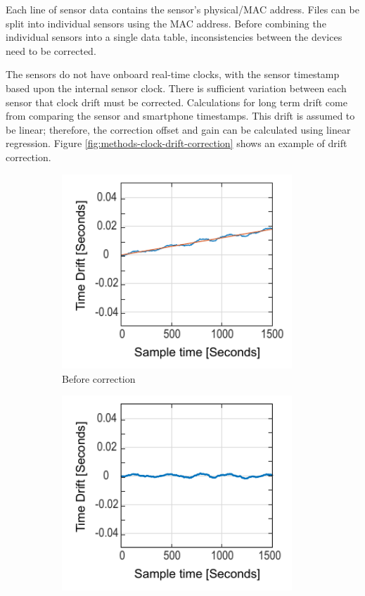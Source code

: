 Each line of sensor data contains the sensor's physical/MAC address. Files can be split into individual sensors using the MAC address. Before combining the individual sensors into a single data table, inconsistencies between the devices need to be corrected.

The sensors do not have onboard real-time clocks, with the sensor timestamp based upon the internal sensor clock. There is sufficient variation between each sensor that clock drift must be corrected. Calculations for long term drift come from comparing the sensor and smartphone timestamps. This drift is assumed to be linear; therefore, the correction offset and gain can be calculated using linear regression. Figure \ref{fig:methods-clock-drift-correction} shows an example of drift correction.

\begin{figure}[hbt]
    \centering
    \begin{subfigure}{0.45\textwidth}
         \centering
         \includegraphics[width=0.95\textwidth]{content/3-Methods/Clock_Drift.pdf}
         \caption{Before correction}
    \end{subfigure}
    \begin{subfigure}{0.45\textwidth}
         \centering
         \includegraphics[width=0.95\textwidth]{content/3-Methods/Clock_Drift_Corrected.pdf}

\end{subfigure}
\end{figure}
